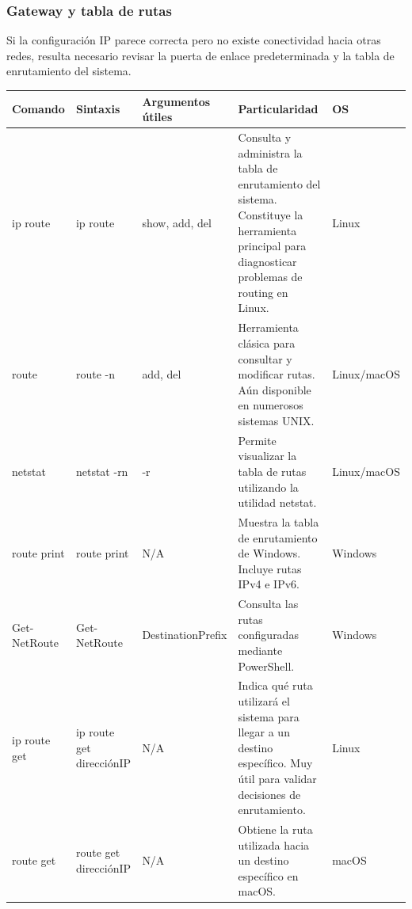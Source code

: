 \documentclass[a4paper,10pt]{article}
\begin{document}
\subsubsection{Gateway y tabla de rutas}

Si la configuración IP parece correcta pero no existe conectividad hacia otras
redes, resulta necesario revisar la puerta de enlace predeterminada y la tabla
de enrutamiento del sistema.

\begin{longtable}{|p{2.8cm}|p{3cm}|p{4cm}|p{5.6cm}|p{1.5cm}|}

\hline
Comando &
Sintaxis &
Argumentos útiles &
Particularidad &
OS
\\
\hline
\endhead

ip route &
ip route &
show, add, del &
Consulta y administra la tabla de enrutamiento del sistema. Constituye la herramienta principal para diagnosticar problemas de routing en Linux. &
Linux
\\
\hline

route &
route -n &
add, del &
Herramienta clásica para consultar y modificar rutas. Aún disponible en numerosos sistemas UNIX. &
Linux/macOS
\\
\hline

netstat &
netstat -rn &
-r &
Permite visualizar la tabla de rutas utilizando la utilidad netstat. &
Linux/macOS
\\
\hline

route print &
route print &
N/A &
Muestra la tabla de enrutamiento de Windows. Incluye rutas IPv4 e IPv6. &
Windows
\\
\hline

Get-NetRoute &
Get-NetRoute &
DestinationPrefix &
Consulta las rutas configuradas mediante PowerShell. &
Windows
\\
\hline

ip route get &
ip route get direcciónIP &
N/A &
Indica qué ruta utilizará el sistema para llegar a un destino específico. Muy útil para validar decisiones de enrutamiento. &
Linux
\\
\hline

route get &
route get direcciónIP &
N/A &
Obtiene la ruta utilizada hacia un destino específico en macOS. &
macOS
\\
\hline

\end{longtable}

\end{document}
